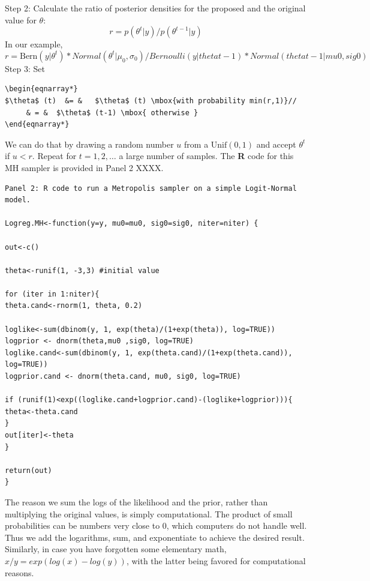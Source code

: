 {\flushleft Step 2: Calculate the ratio of posterior densities for the proposed and the original value for $\theta$: }
\[
r = p(\theta^{t}|y) / p(\theta^{t-1}|y)
\]
In our example, 
\[
r = \mbox{Bern}(y|\theta^{t}) * Normal(\theta^{t}|\mu_0, \sigma_0) / Bernoulli(y|thetat-1) * Normal(thetat-1|mu0, sig0)
\]
Step 3: Set 
\begin{verbatim}
\begin{eqnarray*}
$\theta$ (t)  &= &   $\theta$ (t) \mbox{with probability min(r,1)}//
	 & = & 	$\theta$ (t-1) \mbox{ otherwise }
\end{eqnarray*}
\end{verbatim}


We can do that by drawing a random number $u$ from a
$\mbox{Unif}(0,1)$ and accept $\theta^{t}$ if 
$u<r$.
Repeat for $t = 1,2,\ldots$ a large number of samples. 
The {\bf R} code for this MH sampler is provided in Panel 2 XXXX.
{\small
\begin{verbatim}
Panel 2: R code to run a Metropolis sampler on a simple Logit-Normal model.

Logreg.MH<-function(y=y, mu0=mu0, sig0=sig0, niter=niter) {

out<-c()

theta<-runif(1, -3,3) #initial value

for (iter in 1:niter){
theta.cand<-rnorm(1, theta, 0.2)

loglike<-sum(dbinom(y, 1, exp(theta)/(1+exp(theta)), log=TRUE)) 
logprior <- dnorm(theta,mu0 ,sig0, log=TRUE)
loglike.cand<-sum(dbinom(y, 1, exp(theta.cand)/(1+exp(theta.cand)), log=TRUE))
logprior.cand <- dnorm(theta.cand, mu0, sig0, log=TRUE)

if (runif(1)<exp((loglike.cand+logprior.cand)-(loglike+logprior))){
theta<-theta.cand
}
out[iter]<-theta
}

return(out)
}
\end{verbatim}
}

The reason we sum the logs of the likelihood and the prior, rather than multiplying the original values, is simply computational. The product of small probabilities can be numbers very close to 0, which computers do not handle well. Thus we add the logarithms, sum, and exponentiate to achieve the desired result. Similarly, in case you have forgotten some elementary math, $x/y = exp(log(x)-log(y))$, with the latter being favored for computational reasons. 

